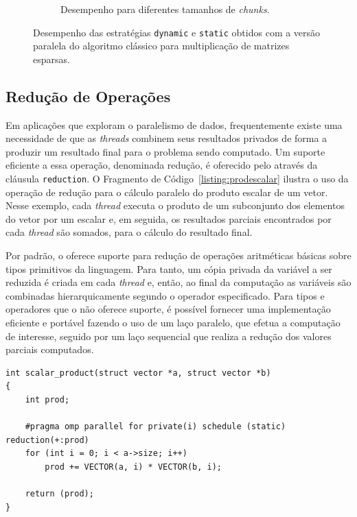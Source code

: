 \documentclass{SBCbookchapter}
\begin{document}
\begin{figure}[t]
\begin{subfigure}{0.45\linewidth}
					\caption{Desempenho para diferentes tamanhos de
					\textit{chunks}.}
					\label{fig:chunk-size}
				\end{subfigure}
			\caption{Desempenho das estratégias \texttt{dynamic} e \texttt{static} obtidos com a versão paralela
			do algoritmo clássico para multiplicação de matrizes esparsas.}
		\end{figure}

	\subsection{Redução de Operações}
	\label{subsection: reducao de operacoes}

		Em aplicações que exploram o paralelismo de dados,
		frequentemente existe uma necessidade de que as \textit{threads}
		combinem seus resultados privados de forma a produzir um
		resultado final para o problema sendo computado. Um suporte
		eficiente a essa operação, denominada redução, é oferecido pelo
		\openmp através da cláusula \texttt{reduction}. O Fragmento de Código~\ref{listing:prodescalar}
		ilustra o uso da operação de redução para o cálculo
		paralelo do produto escalar de um vetor. Nesse exemplo, cada
		\textit{thread} executa o produto de um subconjunto dos
		elementos do vetor por um escalar e, em seguida, os resultados
		parciais encontrados por cada \textit{thread} são somados, para
		o cálculo do resultado final.

		Por padrão, o \openmp oferece suporte  para redução de operações
		aritméticas básicas sobre tipos primitivos da linguagem. Para
		tanto, um cópia privada da variável a ser reduzida é criada em
		cada \textit{thread} e, então, ao final da computação as
		variáveis são combinadas hierarquicamente segundo o operador
		especificado. Para tipos e operadores que o \openmp não oferece
		suporte, é possível fornecer uma implementação eficiente e
		portável fazendo o uso de um laço paralelo, que efetua a
		computação de interesse, seguido por um laço sequencial que
		realiza a redução dos valores parciais computados.

\begin{lstlisting}[frame=single, caption=Produto escalar.,
label=listing:prodescalar]
int scalar_product(struct vector *a, struct vector *b)
{
	int prod;

	#pragma omp parallel for private(i) schedule (static) reduction(+:prod)
	for (int i = 0; i < a->size; i++)
		prod += VECTOR(a, i) * VECTOR(b, i);
	
	return (prod);
}
\end{lstlisting}
\end{document}
